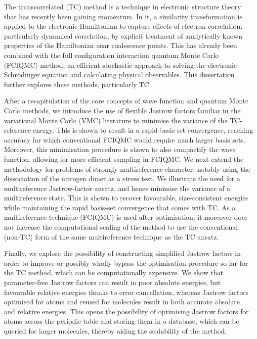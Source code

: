 The transcorrelated (TC) method is a technique in electronic structure theory that has recently been gaining momentum. In it, a similarity transformation is applied to the electronic Hamiltonian to capture effects of electron correlation, particularly dynamical correlation, by explicit treatment of analytically-known properties of the Hamiltonian near coalescence points. This has already been combined with the full configuration interaction quantum Monte Carlo (FCIQMC) method, an efficient stochastic approach to solving the electronic Schrödinger equation and calculating physical observables. This dissertation further explores these methods, particularly TC.

After a recapitulation of the core concepts of wave function and quantum Monte Carlo methods, we introduce the use of flexible Jastrow factors familiar in the variational Monte Carlo (VMC) literature to minimise the variance of the TC-reference energy. This is shown to result in a rapid basis-set convergence, reaching accuracy for which conventional FCIQMC would require much larger basis sets. Moreover, this minimisation procedure is shown to also compactify the wave function, allowing for more efficient sampling in FCIQMC. We next extend the methodology for problems of strongly multireference character, notably using the dissociation of the nitrogen dimer as a stress test. We illustrate the need for a multireference Jastrow-factor ansatz, and hence minimise the variance of a multireference state. This is shown to recover favourable, size-consistent energies while maintaining the rapid basis-set convergence that comes with TC. As a multireference technique (FCIQMC) is used after optimisation, it moreover does not increase the computational scaling of the method to use the conventional (non-TC) form of the same multireference technique as the TC ansatz.

Finally, we explore the possibility of constructing simplified Jastrow factors in order to improve or possibly wholly bypass the optimisation procedure so far for the TC method, which can be computationally expensive. We show that parameter-free Jastrow factors can result in poor absolute energies, but favourable relative energies thanks to error cancellation, whereas Jastrow factors optimised for atoms and reused for molecules result in both accurate absolute and relative energies. This opens the possibility of optimising Jastrow factors for atoms across the periodic table and storing them in a database, which can be queried for larger molecules, thereby aiding the scalability of the method.
